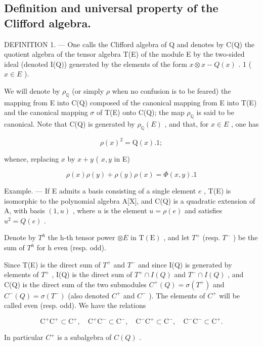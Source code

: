 \subsection{Definition and universal property of the Clifford algebra.}

DEFINITION 1. --- One calls the Clifford algebra of Q and denotes by C(Q) the quotient algebra of the tensor algebra T(E) of the module E by the two-sided ideal (denoted I(Q)) generated by the elements of the form \(x \otimes x - Q(x)\) . 1 ( \(x \in E\) ).

We will denote by \(\rho_{\mathbb{Q}}\) (or simply \(\rho\) when no confusion is to be feared) the mapping from E into C(Q) composed of the canonical mapping from E into T(E) and the canonical mapping \(\sigma\) of T(E) onto C(Q); the map \(\rho_{\mathbb{Q}}\) is said to be canonical. Note that C(Q) is generated by \(\rho_{\mathbb{Q}}(E)\) , and that, for \(x \in E\) , one has

\[
\rho (x) ^ {2} = \mathrm{Q} (x). 1;\tag{1}
\]

whence, replacing \(x\) by \(x + y\) ( \(x, y\) in E)

\[
\rho (x) \rho (y) + \rho (y) \rho (x) = \Phi (x, y). 1\tag{2}
\]

Example. --- If E admits a basis consisting of a single element \(e\) , T(E) is isomorphic to the polynomial algebra A{[}X{]}, and C(Q) is a quadratic extension of A, with basis \((1, u)\) , where \(u\) is the element \(u = \rho(e)\) and satisfies \(u^2 = Q(e)\) .

Denote by \(T^{h}\) the h-th tensor power \(\otimes E\) in \(\mathrm{T}(\mathrm{E})\) , and let \(T^{+}\) (resp. \(T^{-}\) ) be the sum of \(T^{h}\) for h even (resp. odd).

Since T(E) is the direct sum of \(T^{+}\) and \(T^{-}\) and since I(Q) is generated by elements of \(T^{+}\) , I(Q) is the direct sum of \(T^{+} \cap I(Q)\) and \(T^{-} \cap I(Q)\) , and C(Q) is the direct sum of the two submodules \(C^{+}(Q) = \sigma(T^{+})\) and \(C^{-}(Q) = \sigma(T^{-})\) (also denoted \(C^{+}\) and \(C^{-}\) ). The elements of \(C^{+}\) will be called even (resp. odd). We have the relations

\[
\mathrm{C} ^ {+} \mathrm{C} ^ {+} \subset \mathrm{C} ^ {+}, \quad \mathrm{C} ^ {+} \mathrm{C} ^ {-} \subset \mathrm{C} ^ {-}, \quad \mathrm{C} ^ {-} \mathrm{C} ^ {+} \subset \mathrm{C} ^ {-}, \quad \mathrm{C} ^ {-} \mathrm{C} ^ {-} \subset \mathrm{C} ^ {+}.\tag{3}
\]

In particular \(C^{+}\) is a subalgebra of \(C(Q)\) .

